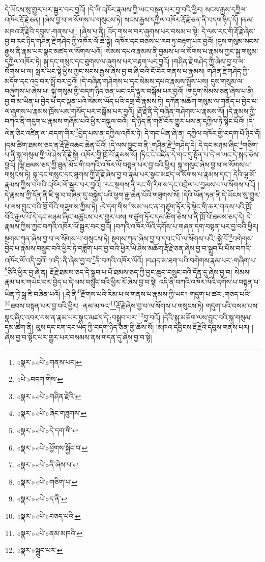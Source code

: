 དེ་ཡོངས་སུ་གྱུར་པར་སྦྱར་བར་བྱའོ། །དེ་ཡི་འཁོར་རྣམས་ཀྱི་ཡང་བསྟན་པར་བྱ་བའི་ཕྱིར། སངས་རྒྱས་དཀྱིལ་འཁོར་རྡོ་རྗེ་ཅན། །ཞེས་བྱ་བ་ལ་སོགས་པ་གསུངས་ཏེ། སངས་རྒྱས་དཀྱིལ་འཁོར་རྡོ་རྗེ་ཅན་ནི་བདག་ཉིད་དོ། །ནམ་མཁའ་རྡོ་རྗེའི་དབུས་:གནས་པ།\footnote{«སྣར་»«པེ་»གནས་པར།} །ཞེས་པ་ནི། འོད་གསལ་བར་ཞུགས་པར་བསམ་པ་སྟེ། དེ་ལས་རང་གི་རྡོ་རྗེ་ཞེས་བྱ་བ་རང་ཉིད་གཤིན་རྗེ་གཤེད་ཀྱི་འཁོར་ལོ་ཆེ་སྟེ། འཁོར་དང་བཅས་པ་རབ་ཏུ་བརྟག་པར་བྱའོ། །དུས་གསུམ་སངས་རྒྱས་ནི་རྣམ་པར་སྣང་མཛད་ལ་སོགས་པའོ། །སེམས་དཔའ་རྣམས་ནི་བྱམས་པ་ལ་སོགས་པ་རྣམས་ཀྱང་སྐུ་གསུམ་དཀྱིལ་འཁོར་ཏེ། སྐུ་དང་གསུང་དང་ཐུགས་ལ་ཞུགས་པར་བརྟག་པར་བྱའོ། །གཤིན་རྗེ་གཤེད་ཀྱི་ཞེས་བྱ་བ་ལ་སོགས་པ་ལ། སླར་ཡང་སྟེ་ཕྱིས་ཀྱང་སངས་རྒྱས་ཞེས་བྱ་བ་ཞི་བའི་ངོ་བོར་གནས་པ་རྣམས། གཤིན་རྗེ་གཤེད་ཀྱི་མདོག་དང་འདྲ་བར་སྤྲོ་བར་བྱའོ། །དེ་བཞིན་གཤེགས་པ་དང་སེམས་དཔའ་རྣམས་སྤྲོས་པས། དུས་གསུམ་ལ་བཞུགས་པ་ཞེས་པ། སྐུ་གསུམ་གྱི་བདག་ཉིད་ཅན་ཡང་འདི་ལྟར་བསྒོམ་པར་བྱའོ། །གདུག་སེམས་ཅན་ཞེས་པ་ནི། བྱ་བ་མ་ཡིན་པ་བྱེད་པ་དང་ལྡན་པའི་སེམས་ཡོད་པའི་དགྲ་བོ་རྣམས་ཏེ། དཀོན་མཆོག་གསུམ་ལ་གནོད་པ་བྱེད་པ་ལ་ཞུགས་པ་རྣམས་ཁྲོས་པས་གསོད་པར་བསྒོམ་པར་བྱའོ། །རྡོ་རྗེ་ནི་དེ་བཞིན་གཤེགས་པ་རྣམས་སོ། །དེ་རྣམས་ཀྱི་བཀའ་ནི་གདུག་པ་རྣམས་གཞོམ་པའི་ཕྱིར་བསྐུལ་བའོ། །དེ་ཉིད་ནི་གཙོ་བོར་གྱུར་པས་ན་དཀྱིལ་ཏེ་སྙིང་པོའོ། །དེ་ལེན་ཅིང་འཛིན་ལ་:བདག་གིར་\footnote{«པེ་»བདག་གིས་}བྱེད་པས་ན་དཀྱིལ་འཁོར་ཏེ། དེ་གང་ཡིན་ཞེ་ན། དཀྱིལ་འཁོར་གྱི་བདག་པོ་ཉིད་དོ། །དམ་ཚིག་ཐམས་ཅད་ན་རྡོ་རྗེ་འཆང་ཆེན་པོའོ། །དེ་ལས་བྱུང་བ་ནི་:གཤིན་རྗེ་\footnote{«སྣར་»«པེ་»གཤིན་རྗེའི་}གཤེད་དེ། དེ་དང་མཉམ་ཞིང་\footnote{«སྣར་»«པེ་»ཞིང་གཟུགས་}གཅིག་པ་ནི་སྐུ་གསུམ་གྱི་ཡེ་ཤེས་རྡོ་རྗེ་སྟེ། འཁོར་གྱི་ཁྲོ་བོ་རྣམས་སོ། །ཏིང་ངེ་འཛིན་དེ་གང་དུ་སྟོན་པ་དེ་ལ་ཡང་དེ་སྐད་ཅེས་བྱའོ། །ལྷ་ཐམས་ཅད་ཀྱི་ཐུན་མོང་གི་བཀའི་འཁོར་ལོ་བསྟན་པར་བྱ་བའི་ཕྱིར། སྐུ་གསུང་ཞེས་བྱ་བ་ལ་སོགས་པ་གསུངས་ཏེ། སྐུ་དང་གསུང་དང་ཐུགས་ཀྱི་རྡོ་རྗེ་ཞེས་བྱ་བ་རྣམ་པར་སྣང་མཛད་ལ་སོགས་པ་རྣམས་དང་། དེའི་ལྷ་མོ་རྣམས་ཀྱིས་བཀའི་འཁོར་ལོ་སྦྱར་བར་བྱའོ། །རང་སྔགས་ནི་རང་གི་རིགས་དང་འབྲེལ་པ་བྱམས་པ་ལ་སོགས་པའོ། །དེ་རྣམས་ཀྱི་དོན་ནི་ཇི་ལྟ་བ་བཞིན་དུ་བསྐྱེད་པའི་ཕྱག་རྒྱ་ཆེན་པོའི་གཟུགས་སོ། །དེའི་ཡོན་ཏན་ནི་དེ་ཡོངས་སུ་གྱུར་པ་ལས་བྱུང་བའི་ཁྲོ་བོའི་གཟུགས་ཀྱིས་ཏེ། :དེ་དག་གིས་\footnote{«སྣར་»«པེ་»དེ་དག་གི་}སམ་ཡང་ན་གཙུག་ཏོར་ཏེ་སྟེང་གི་ཆར་གནས་པའི་ཁྲོ་བོའི་རྒྱལ་པོ་དེ་དང་མཉམ་ཞིང་མཚུངས་པར་གྱུར་པས། གཙུག་ཏོར་དམ་ཚིག་ཅེས་པ་ནི་ཁྲོ་བོ་ཐམས་ཅད་དེ། དེ་རྣམས་ཀྱིས་ཀྱང་བཀའི་འཁོར་ལོ་སྦྱར་བར་བྱའོ། །བཀའི་འཁོར་ལོའི་དགོས་པ་གཞན་དག་བསྟན་པར་བྱ་བའི་ཕྱིར། སྔགས་ཀུན་ཞེས་བྱ་བ་ལ་སོགས་པ་གསུངས་ཏེ། སྔགས་ཀུན་ཞེས་བྱ་བ་དབང་པོ་ལ་སོགས་པའི་:སྐྱེ་བོ་\footnote{«སྣར་»«པེ་»ཕྱོགས་སྐྱོང་བ་}བགེགས་བྱེད་པ་རྣམས་བསྲུང་བའི་ཕྱིར་ཏེ་བཟློག་པར་བྱ་བའི་ཕྱིར་ཡེ་ཤེས་མཆོག་རྡོ་རྗེ་ཅན་ཞེས་བྱ་བ་སྒྲུབ་པ་པོས་བཀའི་འཁོར་ལོ་འདི་བྱའོ། །འདི་:ནི་ཞེས་བྱ་བ་\footnote{«སྣར་»«པེ་»ནི་ཞེས་པ་}ནི་བཀའི་འཁོར་ལོའོ། །བཤད་མ་ཐག་པའི་བགེགས་རྣམ་པར་:གཞིག་པ་\footnote{«སྣར་»«པེ་»གཅིག་པ་}ཅིའི་ཕྱིར་བྱ་ཞེ་ན། རྡོ་རྗེ་ཐམས་ཅད་དེ་སྒྲུབ་པ་པོ་ཐམས་ཅད་ཀྱི་བྱང་ཆུབ་བསྲུང་བའི་དོན་དུ་ཞེས་བྱ་བ། སེམས་རྣམ་པར་གཡེང་བར་བྱེད་པ་དེ་ལས་བསྲུང་བའི་ཕྱིར་རོ་ཞེས་བྱ་བ་སྟེ། འདི་ནི་བཀའི་འཁོར་ལོའི་དགོས་པ་བསྟན་པ་ཡིན་ཏེ་སྒྲ་ཇི་བཞིན་པའོ། །:དེ་ནི་\footnote{«སྣར་»«པེ་»ད་ནི་}རྫོགས་པའི་རིམ་པ་ལ་གནས་པ་རྣམས་ཀྱི་ཡང་། གདུག་པ་ཚར་:གཅད་པའི་\footnote{«སྣར་»«པེ་»བཅད་པའི་}ཐབས་བསྟན་པར་བྱ་བའི་ཕྱིར། :ནམ་མཁའ་\footnote{«སྣར་»«པེ་»ནམ་མཁའི་}རྡོ་རྗེ་ཞེས་བྱ་བ་ལ་སོགས་པ་གསུངས་ཏེ། གདུག་པའི་བསམ་པས་སྣང་ཞིང་འབར་བས་ན་རྣམ་པར་སྣང་མཛད་དེ་:བསྒྲུབ་པར་\footnote{«སྣར་»སྒྲུབ་པར་}བྱ་བའོ། །དེའི་སྐུ་མཆོག་ལས་བྱུང་བའི་སྐུ་གསུམ་དམ་ཚིག་ནི། ལུས་དང་ངག་དང་ཡིད་ཀྱི་བདག་ཉིད་ཅན་གྱི་ཆོས་སོ། །མཁའ་དབྱིངས་རྡོ་རྗེའི་དབུས་གནས་པར། །ཞེས་བྱ་བ་སྟོང་པར་གྱུར་པར་བསམས་ནས་གདན་དུ་ཞེས་བྱ་བ་སྟེ། 